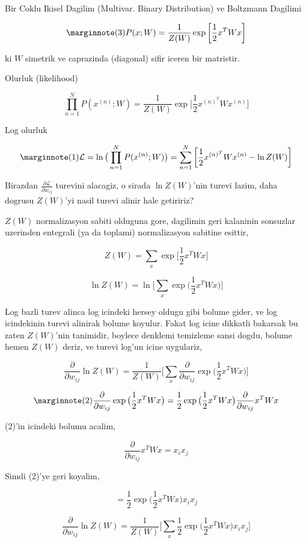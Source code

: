 \documentclass[12pt,fleqn]{article}\usepackage{../common}
\begin{document}
Bir Coklu Ikisel Dagilim (Multivar. Binary Distribution) ve Boltzmann Dagilimi

$$  
\mlabel{3}
P(x;W) = \frac{1}{Z(W)} 
\exp \bigg[ \frac{1}{2} x^T W x \bigg]
$$

ki $W$ simetrik ve caprazinda (diagonal) sifir iceren bir matristir. 

Olurluk (likelihood)

$$  
\prod _{n=1}^{N} P(x^{(n)};W) = \frac{1}{Z(W)} 
\exp \bigg[ \frac{1}{2} x^{(n)^T} W x^{(n)} \bigg]
$$

Log olurluk

$$  
\mlabel{1}
\mathcal{L} = \ln \big( \prod _{n=1}^{N} P(x^{(n)};W) \big) = 
\sum _{n=1}^{N} \bigg[ \frac{1}{2} x^{(n)^T} W x^{(n)} - \ln Z(W) \bigg]
$$

Birazdan $\frac{\partial \mathcal L}{\partial w_{ij}}$ turevini alacagiz, o
sirada $\ln Z(W)$'nin turevi lazim, daha dogrusu $Z(W)$'yi nasil turevi
alinir hale getiririz?

$Z(W)$ normalizasyon sabiti olduguna gore, dagilimin geri kalaninin
sonsuzlar uzerinden entegrali (ya da toplami) normalizasyon sabitine
esittir, 

$$ 
Z(W) = \sum_x  \exp \bigg[ \frac{1}{2} x^T W x \bigg]
 $$

$$ 
\ln Z(W) = \ln \bigg[ \sum_x  \exp \big( \frac{1}{2} x^T W x \big) \bigg]
 $$

Log bazli turev alinca log icindeki hersey oldugu gibi bolume gider, ve log
icindekinin turevi alinirak bolume koyulur. Fakat log icine dikkatli
bakarsak bu zaten $Z(W)$'nin tanimidir, boylece denklemi temizleme sansi
dogdu, bolume hemen $Z(W)$ deriz, ve turevi log'un icine uygulariz,


$$ 
\frac{\partial}{\partial w_{ij}} \ln Z(W) = 
\frac{1}{Z(W)}
\bigg[ 
\sum_x \frac{\partial}{\partial w_{ij}} \exp \big( \frac{1}{2} x^T W x \big) 
\bigg]
 $$


$$ 
\mlabel{2}
\frac{\partial}{\partial w_{ij}} \exp \big( \frac{1}{2} x^T W x \big)  = 
\frac{1}{2}  \exp \big( \frac{1}{2} x^T W x \big) 
\frac{\partial}{\partial w_{ij}}x^T W x
$$

(2)'in icindeki bolumu acalim,

$$ \frac{\partial}{\partial w_{ij}}x^T W x = x_i x_j $$

Simdi (2)'ye geri koyalim,

$$ =  \frac{1}{2}  \exp \big( \frac{1}{2} x^T W x \big) x_i x_j$$

$$ 
\frac{\partial}{\partial w_{ij}} \ln Z(W) = 
\frac{1}{Z(W)}
\bigg[ 
\sum_x \frac{1}{2}  \exp \big( \frac{1}{2} x^T W x \big) x_i x_j
\bigg]
$$
\end{document}
